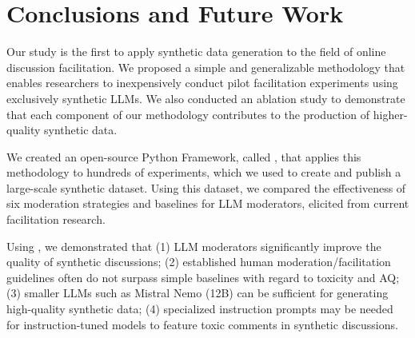 %
\section{Conclusions and Future Work}

Our study is the first to apply synthetic data generation to the field of online discussion facilitation. We proposed a simple and generalizable methodology that enables researchers to inexpensively conduct pilot facilitation experiments using exclusively synthetic \acp{LLM}. We also conducted an ablation study to demonstrate that each component of our methodology contributes to the production of higher-quality synthetic data.

We created an open-source Python Framework, called \syndisco, that applies this methodology to hundreds of experiments, which we used to create and publish \vmd a large-scale synthetic dataset. Using this dataset, we compared the effectiveness of six moderation strategies and baselines for \ac{LLM} moderators, elicited from current facilitation research. 

Using \syndisco, we demonstrated that (1) \ac{LLM} moderators significantly improve the quality of synthetic discussions; (2) established human moderation/facilitation guidelines often do not surpass simple baselines with regard to toxicity and \ac{AQ}; (3) smaller \acp{LLM} such as Mistral Nemo (12B) can be sufficient for generating high-quality synthetic data; (4) specialized instruction prompts may be needed for instruction-tuned models to feature toxic comments in synthetic discussions. %